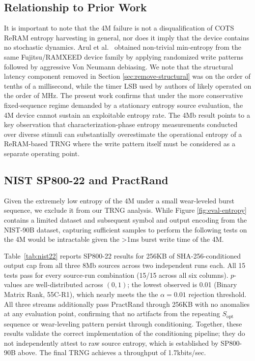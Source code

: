 \subsection{Relationship to Prior Work}
It is important to note that the 4M failure is not a disqualification of COTS ReRAM entropy harvesting in general, nor does it imply that the device contains no stochastic dynamics. Arul et al.~\cite{tolga2024trng} obtained non-trivial min-entropy from the same Fujitsu/RAMXEED device family by applying randomized write patterns followed by aggressive Von Neumann debiasing. We note that the structural latency component removed in Section \ref{sec:remove-structural} was on the order of tenths of a millisecond, while the timer LSB used by authors of \cite{tolga2024trng} likely operated on the order of MHz. The present work confirms that under the more conservative fixed-sequence regime demanded by a stationary entropy source evaluation, the 4M device cannot sustain an exploitable entropy rate. The 4Mb result points to a key observation that characterization-phase entropy measurements conducted over diverse stimuli can substantially overestimate the operational entropy of a ReRAM-based TRNG where the write pattern itself must be considered as a separate operating point.

\subsection{NIST SP800-22 and PractRand}
Given the extremely low entropy of the 4M under a small wear-leveled burst sequence, we exclude it from our TRNG analysis. While Figure \ref{fig:eval-entropy} contains a limited dataset and subsequent symbol and output encoding from the NIST-90B dataset, capturing sufficient samples to perform the following tests on the 4M would be intractable given the >1ms burst write time of the 4M.

Table~\ref{tab:nist22} reports SP800-22 results for 256KB of SHA-256-conditioned output cap from all three 8Mb sources across two independent runs each.  All 15 tests pass for every source-run combination (15/15 across all six columns). $p$-values are well-distributed across $(0,1)$; the lowest observed is 0.01 (Binary Matrix Rank, 55\textdegree{}C-R1), which nearly meets the the $\alpha = 0.01$ rejection threshold. All three streams additionally pass PractRand through 256KB with no anomalies at any evaluation point, confirming that no artifacts from the repeating $S_{\mathrm{opt}}$ sequence or wear-leveling pattern persist through conditioning. Together, these results validate the correct implementation of the conditioning pipeline; they do not independently attest to raw source entropy, which is established by SP800-90B above. The final TRNG achieves a throughput of 1.7kbits/sec. 

